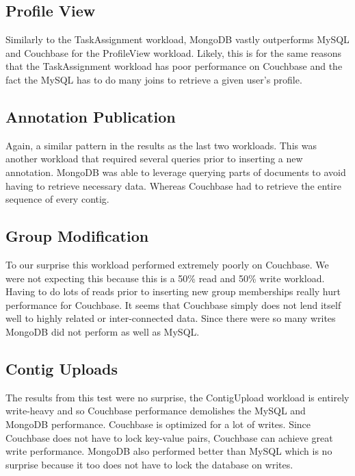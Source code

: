 \documentclass[12pt]{ucthesis}
\begin{document}
\subsection{Profile View}
Similarly to the TaskAssignment workload, MongoDB vastly outperforms MySQL and Couchbase for the
ProfileView workload. Likely, this is for the same reasons that the
TaskAssignment workload has poor performance on Couchbase and the fact the MySQL has
to do many joins to retrieve a given user's profile. 

\subsection{Annotation Publication}
Again, a similar pattern in the results as the last two workloads. This was
another workload that required several queries prior to inserting a new
annotation. MongoDB was able to leverage querying parts of documents to avoid having to retrieve necessary data. Whereas Couchbase had to retrieve the entire sequence of every contig.

\subsection{Group Modification}
To our surprise this workload performed extremely poorly on Couchbase. We were not
expecting this because this is a 50\% read and 50\% write workload. Having to
do lots of reads prior to inserting new group memberships really hurt
performance for Couchbase. It seems that Couchbase simply does not lend itself well to highly
related or inter-connected data. Since there were so many writes MongoDB did not perform as well as
MySQL.

\subsection{Contig Uploads}
The results from this test were no surprise, the ContigUpload workload is
entirely write-heavy and so Couchbase performance demolishes the MySQL and MongoDB performance. Couchbase
is optimized for a lot of writes. Since Couchbase does not have to lock key-value pairs, Couchbase can achieve great write performance. MongoDB also performed better than MySQL which is no surprise because
it too does not have to lock the database on writes.
\end{document}
